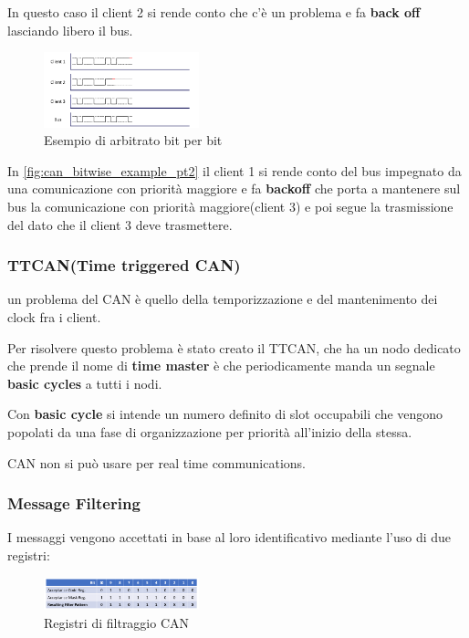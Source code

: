 In questo caso il client 2 si rende conto che c'è un problema e fa \textbf{back off} lasciando libero il bus.
\begin{figure}[!ht]
  \centering
  \includegraphics[width=0.4\textwidth]{./images/can_bitwise_example_pt2.png}
  \caption{Esempio di arbitrato bit per bit}
  \label{fig:can_bitwise_example_pt2}
\end{figure}

In \autoref{fig:can_bitwise_example_pt2} il client 1 si rende conto del bus impegnato da una comunicazione con priorità maggiore e fa \textbf{backoff} che porta a mantenere sul bus la comunicazione con priorità maggiore(client 3) e poi segue la trasmissione del dato che il client 3 deve trasmettere.




\subsubsection{TTCAN(Time triggered CAN)}
un problema del CAN è quello della temporizzazione e del mantenimento dei clock fra i client.

Per risolvere questo problema è stato creato il TTCAN, che ha un nodo dedicato che prende il nome di \textbf{time master} è che periodicamente manda un segnale \textbf{basic cycles} a tutti i nodi.

Con \textbf{basic cycle} si intende un numero definito di slot occupabili che vengono popolati da una fase di organizzazione per priorità all'inizio della stessa.


CAN non si può usare per real time communications.

\subsubsection{Message Filtering}

I messaggi vengono accettati in base al loro identificativo mediante l'uso di due registri:
\begin{figure}[!ht]
  \centering
  \includegraphics[width=0.4\textwidth]{./images/can_filte.png}
  \caption{Registri di filtraggio CAN}
  \label{fig:can_filter}
\end{figure}


